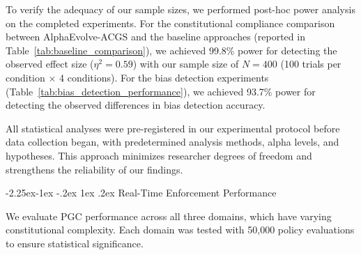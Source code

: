 \documentclass[manuscript,screen,review,anonymous,9pt]{acmart}
\makeatletter
\renewcommand\subsection{\@startsection{subsection}{2}{\z@}%
  {-2.25ex\@plus -1ex \@minus -.2ex}%
  {1ex \@plus .2ex}%
  {\normalfont\large\bfseries}}
\makeatother
\begin{document}
To verify the adequacy of our sample sizes, we performed post-hoc power analysis on the completed experiments. For the constitutional compliance comparison between AlphaEvolve-ACGS and the baseline approaches (reported in Table~\ref{tab:baseline_comparison}), we achieved 99.8\% power for detecting the observed effect size ($\eta^2 = 0.59$) with our sample size of $N=400$ (100 trials per condition × 4 conditions). For the bias detection experiments (Table~\ref{tab:bias_detection_performance}), we achieved 93.7\% power for detecting the observed differences in bias detection accuracy.

All statistical analyses were pre-registered in our experimental protocol before data collection began, with predetermined analysis methods, alpha levels, and hypotheses. This approach minimizes researcher degrees of freedom and strengthens the reliability of our findings.

\subsection{Real-Time Enforcement Performance}
\label{subsec:pgc_performance}

We evaluate PGC performance across all three domains, which have varying constitutional complexity. Each domain was tested with 50,000 policy evaluations to ensure statistical significance.
\end{document}
